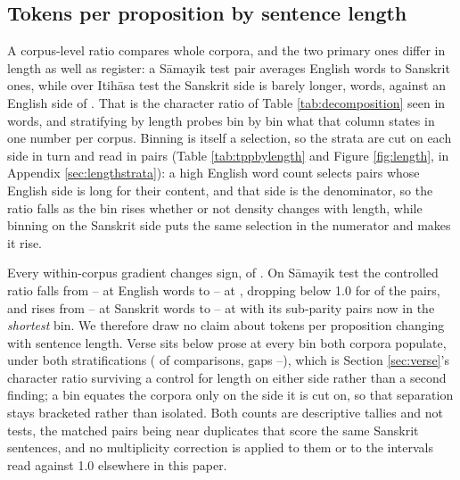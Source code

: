 \documentclass[11pt]{article}
\begin{document}
\subsection{Tokens per proposition by sentence length}
\label{sec:length}

A corpus-level ratio compares whole corpora, and the two primary ones differ in length as
well as register: a S\=amayik test pair averages \numSamayikMeanEnWords{} English words to
\numSamayikMeanSaWords{} Sanskrit ones, while over Itih\=asa test the Sanskrit side is
barely longer, \numItihasaMeanSaWords{} words, against an English side of
\numItihasaMeanEnWords. That is the
character ratio of Table \ref{tab:decomposition} seen in words, and stratifying by length
probes bin by bin what that column states in one number per corpus. Binning is itself a
selection, so the strata are cut on each side in turn and read in pairs (Table
\ref{tab:tppbylength} and Figure \ref{fig:length}, in Appendix \ref{sec:lengthstrata}): a
high English word count selects pairs whose English side is long for their content, and
that side is the denominator, so the ratio falls as the bin rises whether or not density
changes with length, while binning on the Sanskrit side puts the same selection in the
numerator and makes it rise.

Every within-corpus gradient changes sign, \numLengthGradientsFlipped{} of
\numLengthGradientsTotal. On S\=amayik test the controlled ratio falls from
\numLengthEnFirstLo--\numLengthEnFirstHi{} at \numLengthEnFirstBin{} English words to
\numLengthEnLastLo--\numLengthEnLastHi{} at \numLengthEnLastBin, dropping below 1.0 for
\numLengthPairsBelowOneEn{} of the \numControlledPairs{} pairs, and rises from
\numLengthSaFirstLo--\numLengthSaFirstHi{} at \numLengthSaFirstBin{} Sanskrit words to
\numLengthSaLastLo--\numLengthSaLastHi{} at \numLengthSaLastBin{} with its
\numLengthPairsBelowOneSa{} sub-parity pairs now in the \emph{shortest} bin. We therefore
draw no claim about tokens per proposition changing with sentence length. Verse sits below
prose at every bin both corpora populate, under both stratifications
(\numVerseBelowProseComparisons{} of \numVerseBelowProseTotal{} comparisons, gaps
\numVerseProseGapMin--\numVerseProseGapMax), which is Section \ref{sec:verse}'s character
ratio surviving a control for length on either side rather than a second finding; a bin
equates the corpora only on the side it is cut on, so that separation stays bracketed
rather than isolated. Both counts are descriptive tallies and not tests, the matched pairs
being near duplicates that score the same Sanskrit sentences, and no multiplicity
correction is applied to them or to the intervals read against 1.0 elsewhere in this
paper.
\end{document}
